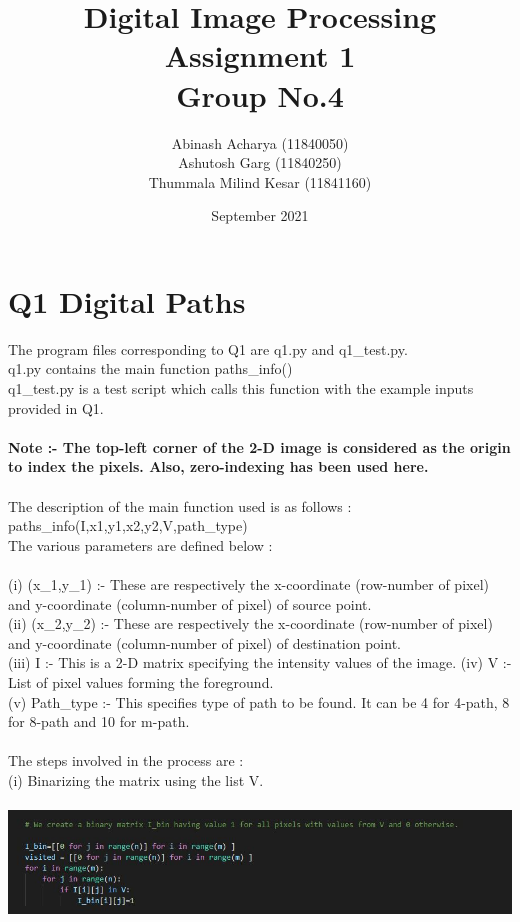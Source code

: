 \documentclass[12pt]{article}
\title{Digital Image Processing \\ Assignment 1 \\ Group No.4}
\author{Abinash Acharya (11840050) \\ Ashutosh Garg (11840250) \\ Thummala Milind Kesar (11841160)}
\date{September 2021}
\begin{document}
\maketitle

\section{Q1 Digital Paths} 
The program files corresponding to Q1 are q1.py and q1\_test.py. \\
q1.py contains the main function paths\_info() \\ 
q1\_test.py is a test script which calls this function with the example inputs provided in Q1. \\ \\
\textbf{Note :- The top-left corner of the 2-D image is considered as the origin to index the pixels. Also, zero-indexing has been used here.} \\ \\
The description of the main function used is as follows : \\ 
paths\_info(I,x1,y1,x2,y2,V,path\_type) \\
The various parameters are defined below : \\ \\
(i) (x\_1,y\_1) :- These are respectively the x-coordinate (row-number of pixel) and y-coordinate (column-number of pixel) of source point. \\
(ii) (x\_2,y\_2) :- These are respectively the x-coordinate (row-number of pixel) and y-coordinate (column-number of pixel) of destination point. \\
(iii) I :- This is a 2-D matrix specifying the intensity values of the image. 
(iv) V :- List of pixel values forming the foreground. \\
(v) Path\_type :- This specifies type of path to be found. It can be 4 for 4-path, 8 for 8-path and 10 for m-path. \\ \\
The steps involved in the process are : \\
(i) Binarizing the matrix using the list V. \\ \\
\includegraphics[width=\linewidth]{Binarise.JPG}
\end{document}
